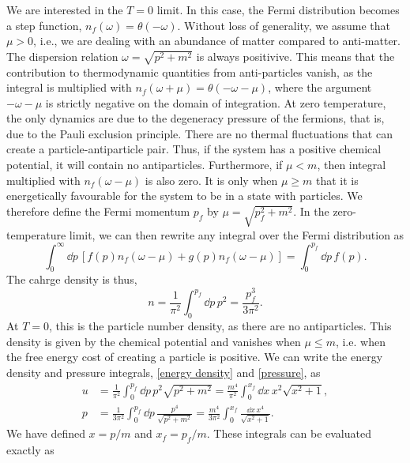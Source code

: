 We are interested in the $T = 0$ limit.
In this case, the Fermi distribution becomes a step function, $n_f(\omega) = \theta(-\omega)$.
Without loss of generality, we assume that $\mu > 0$, i.e., we are dealing with an abundance of matter compared to anti-matter.
The dispersion relation $\omega = \sqrt{p^2 + m^2}$ is always positivive.
This means that the contribution to thermodynamic quantities from anti-particles vanish, as the integral is multiplied with $n_f(\omega + \mu) = \theta(-\omega - \mu)$, where the argument $-\omega - \mu$ is strictly negative on the domain of integration.
At zero temperature, the only dynamics are due to the degeneracy pressure of the fermions, that is, due to the Pauli exclusion principle.
There are no thermal fluctuations that can create a particle-antiparticle pair.
Thus, if the system has a positive chemical potential, it will contain no antiparticles.
Furthermore, if $\mu< m$, then integral multiplied with $n_f(\omega - \mu)$ is also zero.
It is only when $\mu\geq m$ that it is energetically favourable for the system to be in a state with particles.
We therefore define the Fermi momentum $p_f$ by $\mu = \sqrt{p_f^2 + m^2}$. 
In the zero-temperature limit, we can then rewrite any integral over the Fermi distribution as
%
\begin{equation}
    \int_0^\infty \dd p \, [f(p) n_f(\omega - \mu) + g(p) n_f(\omega - \mu)]= \int_0^{p_f} \dd p \, f(p).
\end{equation}
%
The cahrge density is thus,
%
\begin{equation}
    n = \frac{1}{\pi^2} \int_0^{p_f} \dd p\, p^2 = \frac{p_f^3}{3 \pi^2}.
\end{equation}
%
At $T = 0$, this is the particle number density, as there are no antiparticles.
This density is given by the chemical potential and vanishes when $\mu \leq m$, i.e. when the free energy cost of creating a particle is positive.
We can write the energy density and pressure integrals, \autoref{energy density} and \autoref{pressure}, as
%
\begin{align}
    u &= \frac{1}{\pi^2} \int_0^{p_f} \dd p \,
    p^2 \sqrt{p^2 + m^2}
    = \frac{m^4}{\pi^2} \int_0^{x_f} \dd x \, x^2 \sqrt{x^2 + 1}, \\
    p & = \frac{1}{3 \pi^2} \int_0^{p_f} \dd p \,  \frac{p^4}{\sqrt{p^2 + m^2}} 
    = \frac{m^4}{3 \pi^2} \int_0^{x_f} \frac{\dd x \, x^4}{\sqrt{x^2 + 1}}.
\end{align}
% 
We have defined $x = p / m$ and $x_f = p_f/m$.
These integrals can be evaluated exactly as
